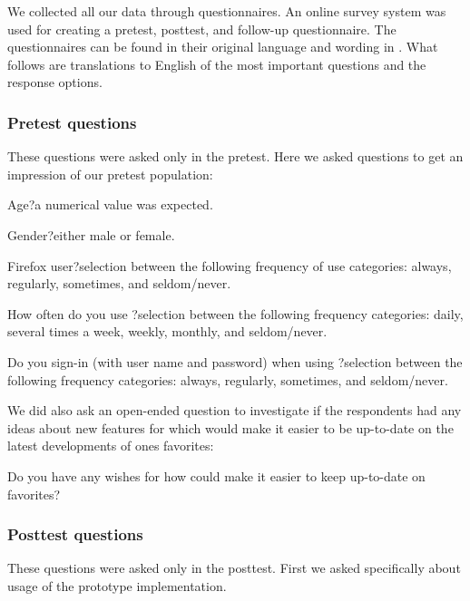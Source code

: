 We collected all our data through questionnaires. An online survey system was
used for creating a pretest, posttest, and follow-up questionnaire. The
questionnaires can be found in their original language and wording in
. What follows are translations to English
of the most important questions and the response options.

\subsubsection{Pretest questions}

These questions were asked only in the pretest. Here we asked questions to
get an impression of our pretest population:

\begin{items}
  \item Age{}?\dash{}a numerical value was expected.
  \item Gender{}?\dash{}either male or female.
  \item Firefox user{}?\dash{}selection between the following frequency of use
    categories: always, regularly, sometimes, and seldom/never.
  \item How often do you use \urort{}?\dash{}selection between the following
    frequency categories: daily, several times a week, weekly, monthly,
    and seldom/never.
  \item Do you sign-in (with user name and password) when using
    \urort{}?\dash{}selection between the following frequency
    categories: always, regularly, sometimes, and seldom/never.
\end{items}

We did also ask an open-ended question to investigate if the respondents had
any ideas about new features for \urort{} which would make it easier to
be up-to-date on the latest developments of ones favorites:

\begin{items}
  \item Do you have any wishes for how \urort{} could make it easier to
    keep up-to-date on favorites?
\end{items}

\subsubsection{Posttest questions}

These questions were asked only in the posttest. First we asked specifically
about usage of the prototype implementation.

